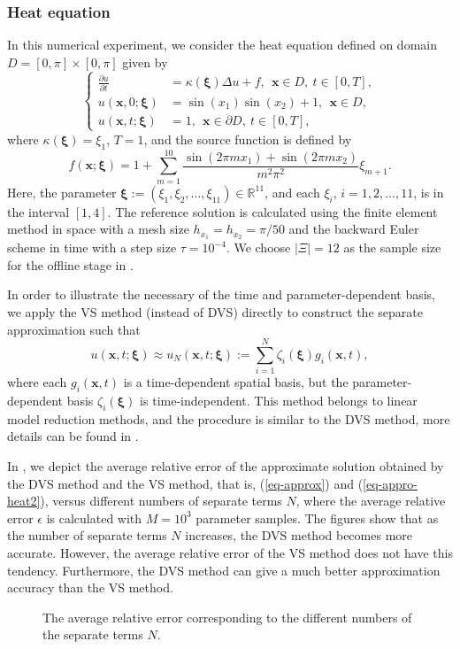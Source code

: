 \documentclass[10pt,a4paper]{article}
\numberwithin{equation}{section}
\numberwithin{lemma}{section}
\numberwithin{example}{section}
\numberwithin{definition}{section}
\numberwithin{assumption}{section}
\numberwithin{theorem}{section}
\numberwithin{proposition}{section}
\numberwithin{corollary}{section}
\numberwithin{remark}{section}
\def\[{\begin{equation}}
\begin{document}
\subsubsection{Heat equation}
\label{num-heat}
In this numerical experiment, we consider the heat equation defined on domain $D=[0,\pi]\times[0,\pi]$ given by
$$
    \left\{
    \begin{aligned}
        \frac{\partial u}{\partial t}&=\kappa(\bm{\xi})\Delta u+f, ~~ \bm{x}\in D,~t\in[0,T],\\
        u(\bm{x},0;\bm{\xi})&=\sin(x_1)\sin(x_2)+1, ~~ \bm{x}\in D,
        \\[1mm]
        u(\bm{x},t;\bm{\xi})&=1,~~ \bm{x}\in \partial D, ~t\in[0,T],
    \end{aligned}
    \right.
$$
where $\kappa(\bm{\xi})={\xi}_1$, $T=1$, and the source function is defined by 
$$
f(\bm{x};\bm{\xi})=1+\sum_{m=1}^{10}\frac{\sin(2\pi mx_1)+\sin(2\pi mx_2)}{m^2\pi^2}{\xi}_{m+1}.
$$
 Here, the parameter $\bm{\xi}:=({\xi}_1,{\xi}_2,\dots,{\xi}_{11})\in\mathbb{R}^{11} $, and each ${\xi}_i$, $i=1,2,\dots,11$, is in the interval $[1,4]$.
The reference solution is calculated using the finite element method in space with a mesh size $h_{{x}_1}=h_{{x}_2}=\pi/50$ and the backward Euler scheme in time with a step size $\tau=10^{-4}$. We choose $|\Xi|=12$ as the sample size for the offline stage in .


In order to illustrate the necessary of the time and parameter-dependent basis, we apply the VS method (instead of DVS) directly to construct the separate approximation such that  
\begin{equation}
    \label{eq-appro-heat2}
    u(\bm{x},t;\bm{\xi})\approx u_{N}(\bm{x},t;\bm{\xi}):=\sum_{i=1}^{N}\zeta_i(\bm{\xi})g_i(\bm{x},t),
\end{equation}
where each $g_i(\bm{x},t)$ is a time-dependent spatial basis, but the parameter-dependent basis $\zeta_i(\bm{\xi})$ is time-independent. This method belongs to linear model reduction methods, and the procedure is similar to the DVS method, more details can be found in .




In , we depict the average relative error of the approximate solution obtained by the DVS method and the VS method, that is, (\ref{eq-approx}) and (\ref{eq-appro-heat2}), versus different numbers of separate terms $N$, where the average relative error $\epsilon$ is calculated with $M=10^3$ parameter samples.  
The figures show that as the number of separate terms $N$ increases, the DVS method becomes more accurate. However, the average relative error of the VS method does not have this tendency. Furthermore, the DVS method can give a much better approximation accuracy than the VS method. 
\begin{figure}[htbp]
    \centering
    \caption{The average relative error corresponding to the different numbers of the separate terms $N$.}
    \label{fig1.1}
\end{figure}
	
\end{document}
